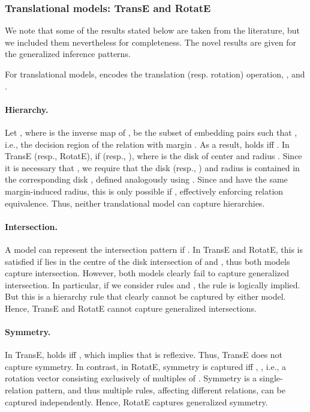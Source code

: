 \documentclass{article}
\begin{document}
\subsubsection{Translational models: TransE and RotatE}
We note that some of the results stated below are taken from the literature, but we included them nevertheless for completeness. The novel results are given for the generalized inference patterns.

For translational models,  encodes the translation (resp. rotation) operation, , and .

\paragraph{Hierarchy.} Let , where  is the inverse map of , be the subset of embedding pairs  such that , i.e., the decision region of the relation  with margin . 
As a result,  holds iff  . In TransE (resp., RotatE),    if  (resp., ), where  is the disk of center  and radius . 
Since it is necessary that ,  we require that the disk  (resp., ) and radius  is contained in the corresponding disk , defined analogously using . Since  and  have the same margin-induced radius, this is only possible if , effectively enforcing relation equivalence. Thus, neither translational model can capture hierarchies.

\paragraph{Intersection.} A model can represent the intersection pattern  if . In TransE and RotatE, this is satisfied if  lies in the centre of the disk intersection of  and , thus both models capture intersection. However, both models clearly fail to capture generalized intersection. In particular, if we consider rules  and , the rule  is logically implied. But this is a hierarchy rule that clearly cannot be captured by either model. Hence, TransE and RotatE cannot capture generalized intersections.  


\paragraph{Symmetry.} In TransE,  holds iff , which implies that  is reflexive. Thus, TransE does not capture symmetry. 
In contrast, in RotatE, symmetry is captured iff , , i.e., a rotation vector consisting exclusively of multiples of . Symmetry is a single-relation pattern, and thus multiple rules, affecting different relations, can be captured independently. Hence, RotatE captures generalized symmetry. 
\end{document}
